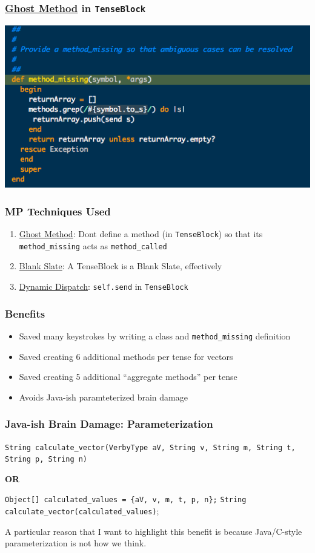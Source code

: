 \documentclass[slidestop,compress,mathserif]{beamer}
\begin{document}
\begin{frame}
	\frametitle{\underline{Ghost Method} in \texttt{TenseBlock}}
	\includegraphics[scale=0.45]{img/tenseblock_mm.png}
\end{frame}

\begin{frame}
	\frametitle{MP Techniques Used}
	\begin{enumerate}
		\item \underline{Ghost Method}:  Dont define a method (in \texttt{TenseBlock}) so that its \texttt{method\_missing} acts as \texttt{method\_called}
		\item \underline{Blank Slate}:  A TenseBlock is a Blank Slate, effectively
		\item \underline{Dynamic Dispatch}:  \texttt{self.send} in \texttt{TenseBlock}
	\end{enumerate}
\end{frame}


\begin{frame}
	\frametitle{Benefits}
	\begin{itemize}
		\item Saved many keystrokes by writing a class and \texttt{method\_missing} definition
		\pause
		\item Saved creating 6 additional methods per tense for vectors
		\pause
		\item Saved creating 5 additional ``aggregate methods'' per tense
		\pause
		\item Avoids Java-ish paramteterized brain damage
	\end{itemize}
\end{frame}

\begin{frame}
	\frametitle{Java-ish Brain Damage:  Parameterization}	
 	\texttt{String calculate\_vector(VerbyType aV, String v, String m, String t, String p, String n)}
	\vskip 0.5cm

	\begin{center}
		\textbf{OR}
	\end{center}

	\vskip 0.5cm	
	\texttt{Object[] calculated\_values = \{aV, v, m, t, p, n\};} 
	\texttt{String calculate\_vector(calculated\_values)}; 	
\end{frame}
\note
{A particular reason that I want to highlight this benefit is because Java/C-style
parameterization is not how we think.
}
\end{document}
